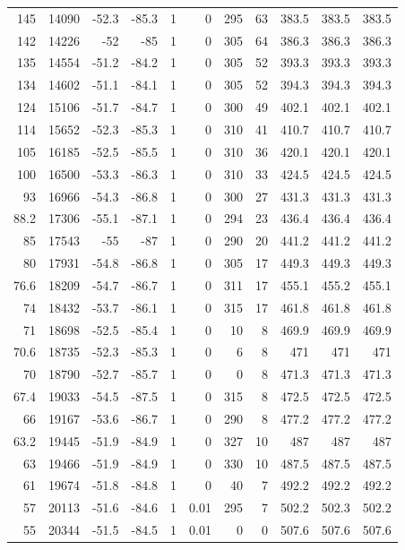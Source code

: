 \documentclass{article}
\begin{document}
\begin{longtable}{r|r|r|r|r|r|r|r|r|r|r}
145 & 14090 & -52.3 & -85.3 & 1 & 0 & 295 & 63 & 383.5 & 383.5 & 383.5 \\
142 & 14226 & -52 & -85 & 1 & 0 & 305 & 64 & 386.3 & 386.3 & 386.3 \\
135 & 14554 & -51.2 & -84.2 & 1 & 0 & 305 & 52 & 393.3 & 393.3 & 393.3 \\
134 & 14602 & -51.1 & -84.1 & 1 & 0 & 305 & 52 & 394.3 & 394.3 & 394.3 \\
124 & 15106 & -51.7 & -84.7 & 1 & 0 & 300 & 49 & 402.1 & 402.1 & 402.1 \\
114 & 15652 & -52.3 & -85.3 & 1 & 0 & 310 & 41 & 410.7 & 410.7 & 410.7 \\
105 & 16185 & -52.5 & -85.5 & 1 & 0 & 310 & 36 & 420.1 & 420.1 & 420.1 \\
100 & 16500 & -53.3 & -86.3 & 1 & 0 & 310 & 33 & 424.5 & 424.5 & 424.5 \\
93 & 16966 & -54.3 & -86.8 & 1 & 0 & 300 & 27 & 431.3 & 431.3 & 431.3 \\
88.2 & 17306 & -55.1 & -87.1 & 1 & 0 & 294 & 23 & 436.4 & 436.4 & 436.4 \\
85 & 17543 & -55 & -87 & 1 & 0 & 290 & 20 & 441.2 & 441.2 & 441.2 \\
80 & 17931 & -54.8 & -86.8 & 1 & 0 & 305 & 17 & 449.3 & 449.3 & 449.3 \\
76.6 & 18209 & -54.7 & -86.7 & 1 & 0 & 311 & 17 & 455.1 & 455.2 & 455.1 \\
74 & 18432 & -53.7 & -86.1 & 1 & 0 & 315 & 17 & 461.8 & 461.8 & 461.8 \\
71 & 18698 & -52.5 & -85.4 & 1 & 0 & 10 & 8 & 469.9 & 469.9 & 469.9 \\
70.6 & 18735 & -52.3 & -85.3 & 1 & 0 & 6 & 8 & 471 & 471 & 471 \\
70 & 18790 & -52.7 & -85.7 & 1 & 0 & 0 & 8 & 471.3 & 471.3 & 471.3 \\
67.4 & 19033 & -54.5 & -87.5 & 1 & 0 & 315 & 8 & 472.5 & 472.5 & 472.5 \\
66 & 19167 & -53.6 & -86.7 & 1 & 0 & 290 & 8 & 477.2 & 477.2 & 477.2 \\
63.2 & 19445 & -51.9 & -84.9 & 1 & 0 & 327 & 10 & 487 & 487 & 487 \\
63 & 19466 & -51.9 & -84.9 & 1 & 0 & 330 & 10 & 487.5 & 487.5 & 487.5 \\
61 & 19674 & -51.8 & -84.8 & 1 & 0 & 40 & 7 & 492.2 & 492.2 & 492.2 \\
57 & 20113 & -51.6 & -84.6 & 1 & 0.01 & 295 & 7 & 502.2 & 502.3 & 502.2 \\
55 & 20344 & -51.5 & -84.5 & 1 & 0.01 & 0 & 0 & 507.6 & 507.6 & 507.6 \\

\end{longtable}
\end{document}
